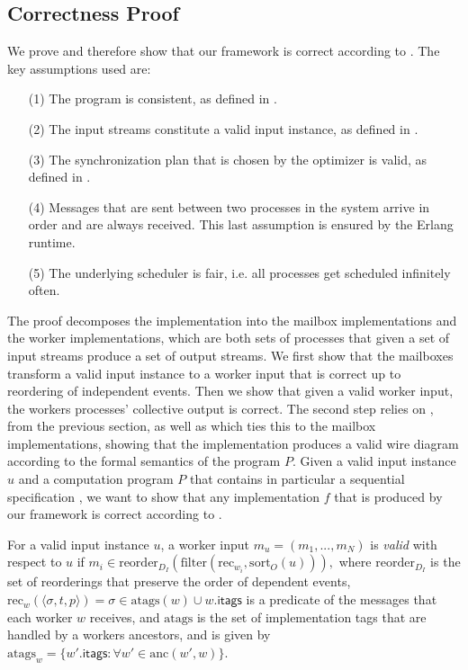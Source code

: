\subsection{Correctness Proof}
\label{appendix:correctness}

We prove  and therefore show that our framework is correct according to .
The key assumptions used are:
\begin{enumerate}
\item[(1)] The program is consistent, as defined in .
\item[(2)] The input streams constitute a valid input instance, as defined in .
\item[(3)] The synchronization plan that is chosen by the optimizer is valid, as defined in .
\item[(4)] Messages that are sent between two processes in the system arrive in order and are always received. This last assumption is ensured by the Erlang runtime.
\item[(5)] The underlying scheduler is fair, i.e. all processes get scheduled infinitely often.
\end{enumerate}

The proof decomposes the implementation into the mailbox
implementations and the worker implementations, which are both sets of
processes that given a set of input streams produce a set of output
streams. We first show that the mailboxes transform a valid input
instance to a worker input that is correct up to reordering of
independent events. Then we show that given a valid worker input, the
workers processes' collective output is correct.
The second step relies on
,
from the previous section, as well as
which ties this to the mailbox implementations,
showing that the implementation produces a valid wire diagram according to the formal semantics of the program $P$.
Given a valid input instance $u$ and a computation program $P$ that contains
in particular a sequential specification ,
we want to show that any implementation $f$ that is produced by our framework is correct according to .

\begin{definition}
For a valid input instance $u$, a worker input $m_u = (m_1, ..., m_N)$
is \emph{valid} with respect to $u$ if $m_i \in \mathrm{reorder}_{D_I}
(\mathrm{filter}(\mathrm{rec}_{w_i}, \mathrm{sort}_O(u))),$ where
$\mathrm{reorder}_{D_I}$ is the set of reorderings that preserve the
order of dependent events,
  $\mathrm{rec}_w(\langle \sigma, t, p\rangle) = \sigma \in \mathrm{atags}(w) \cup w.\mathsf{itags}$
  is a predicate of the messages that each worker $w$ receives,
  and $\mathrm{atags}$ is the set of implementation tags that are handled by a workers ancestors, and is given by $\mathrm{atags}_w = \{ {w'}.\mathsf{itags} : \forall w' \in \mathrm{anc}(w', w)\}$.
\end{definition}

